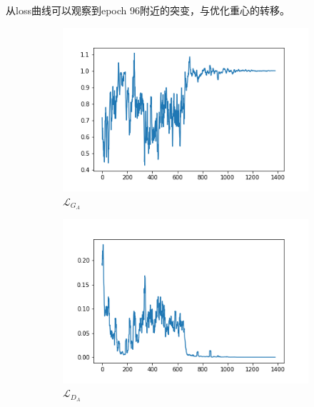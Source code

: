 \documentclass{beamer}
\begin{document}
\begin{frame}
    从loss曲线可以观察到epoch 96附近的突变，与优化重心的转移。
    \begin{figure}[htb]
        \centering
        \begin{subfigure}[b]{0.23\linewidth}
            \includegraphics[width=\linewidth]{exp2_G_A.png}
            \caption{$\mathcal{L}_{G_A}$}
          \end{subfigure}
          \begin{subfigure}[b]{0.23\linewidth}
            \includegraphics[width=\linewidth]{exp2_D_A.png}
            \caption{$\mathcal{L}_{D_A}$}
          \end{subfigure}
          \begin{subfigure}[b]{0.23\linewidth}

\end{subfigure}
\end{figure}
\end{frame}
\end{document}
